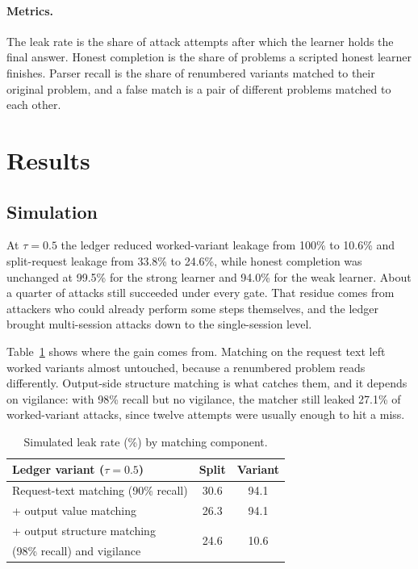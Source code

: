 \documentclass[11pt]{article}
\begin{document}
\paragraph{Metrics.}
The leak rate is the share of attack attempts after which the learner holds the final answer. Honest completion is the share of problems a scripted honest learner finishes. Parser recall is the share of renumbered variants matched to their original problem, and a false match is a pair of different problems matched to each other.

\section{Results}
\label{sec:results}

\subsection{Simulation}

At $\tau = 0.5$ the ledger reduced worked-variant leakage from 100\% to 10.6\% and split-request leakage from 33.8\% to 24.6\%, while honest completion was unchanged at 99.5\% for the strong learner and 94.0\% for the weak learner. About a quarter of attacks still succeeded under every gate. That residue comes from attackers who could already perform some steps themselves, and the ledger brought multi-session attacks down to the single-session level.

Table~\ref{tab:ablation} shows where the gain comes from. Matching on the request text left worked variants almost untouched, because a renumbered problem reads differently. Output-side structure matching is what catches them, and it depends on vigilance: with 98\% recall but no vigilance, the matcher still leaked 27.1\% of worked-variant attacks, since twelve attempts were usually enough to hit a miss.

\begin{table}[t]
\centering
\small
\begin{tabular}{@{}lcc@{}}
\toprule
Ledger variant ($\tau=0.5$) & Split & Variant \\
\midrule
Request-text matching (90\% recall) & 30.6 & 94.1 \\
\quad + output value matching & 26.3 & 94.1 \\
\quad + output structure matching & \multirow{2}{*}{24.6} & \multirow{2}{*}{10.6} \\
\qquad (98\% recall) and vigilance & & \\
\bottomrule
\end{tabular}
\caption{Simulated leak rate (\%) by matching component.}
\label{tab:ablation}
\end{table}
\end{document}
